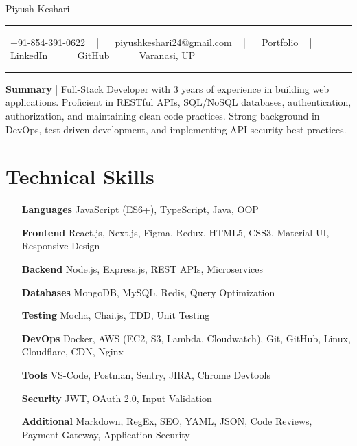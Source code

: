 \documentclass[letterpaper, 10pt]{article}
\newcommand{\documentTitle}[2]{
\begin{center}
	{\Huge\color{accentTitle} #1}
	\vspace{2pt}
	{\color{accentLine} \hrule height 0.8pt}
	\vspace{1pt}
	\footnotesize{#2}
	\vspace{1pt}
	{\color{accentLine} \hrule height 0.8pt}
\end{center}
}
\newcommand{\tinysection}[1]{ \phantomsection
\addcontentsline{toc}{section}{#1}
{\large{\bfseries\color{accentText}#1} {\color{accentLine} |}}
\vspace{0.4pt}
}
\begin{document}
	\documentTitle{Piyush Keshari}{ \href{tel:+918543910622}{\underline{ \raisebox{-0.05\height}{\faPhone}\ +91-854-391-0622}} ~ | ~ \href{mailto:piyushkeshari24@gmail.com}{\underline{ \raisebox{-0.15\height}{\faEnvelope}\ piyushkeshari24@gmail.com}} ~ | ~ \href{https://kesharipiyush24.github.io/}{\underline{ \raisebox{-0.15\height}{\faGlobe}\ Portfolio}} ~ | ~ \href{https://linkedin.com/in/piyush-k-ba3a67134}{\underline{ \raisebox{-0.15\height}{\faLinkedin}\ LinkedIn}} ~ | ~ \href{https://github.com/KeshariPiyush24}{\underline{ \raisebox{-0.15\height}{\faGithub}\ GitHub}} ~ | ~ \underline{ \raisebox{-0.15\height}{\faMapMarker}\ Varanasi, UP} }

	\tinysection{Summary} Full-Stack Developer with 3 years of experience in
	building web applications. Proficient in RESTful APIs, SQL/NoSQL databases, authentication, authorization, and maintaining clean code practices. Strong background in DevOps, test-driven development, and implementing API security best practices.

	\section{Technical Skills}
	\begin{multicols}{2}
		\begin{itemize}[itemsep=-2pt, parsep=0.5pt, leftmargin=65pt]
			\item[\textbf{Languages}] JavaScript (ES6+), TypeScript, Java, OOP

			\item[\textbf{Frontend}] React.js, Next.js, Figma, Redux, HTML5, CSS3, Material UI,
				Responsive Design

			\item[\textbf{Backend}] Node.js, Express.js, REST APIs, Microservices

			\item[\textbf{Databases}] MongoDB, MySQL, Redis, Query Optimization

			\item[\textbf{Testing}] Mocha, Chai.js, TDD, Unit Testing

			\item[\textbf{DevOps}] Docker, AWS (EC2, S3, Lambda, Cloudwatch), Git, GitHub,
				Linux, Cloudflare, CDN, Nginx

			\item[\textbf{Tools}] VS-Code, Postman, Sentry, JIRA, Chrome Devtools

			\item[\textbf{Security}] JWT, OAuth 2.0, Input Validation

			\item[\textbf{Additional}] Markdown, RegEx, SEO, YAML, JSON, Code Reviews,
				Payment Gateway, Application Security
		\end{itemize}
	\end{multicols}
\end{document}

